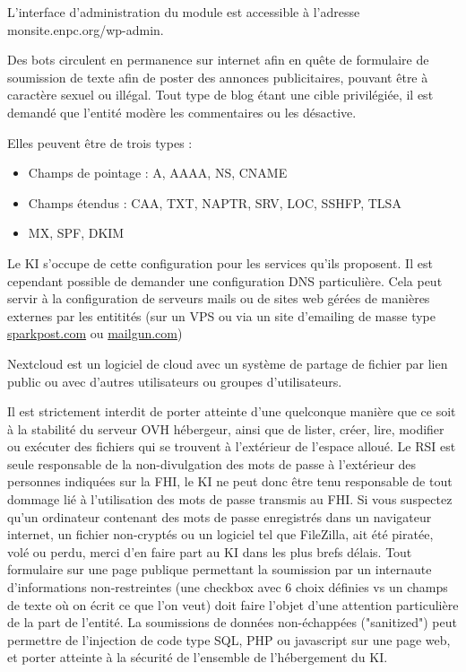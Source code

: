 \documentclass{ki019}
\begin{document}


L'interface d'administration du module est accessible à l'adresse monsite.enpc.org/wp-admin.

Des bots circulent en permanence sur internet afin en quête de formulaire de soumission de texte afin de poster des annonces publicitaires, pouvant être à caractère sexuel ou illégal. Tout type de blog étant une cible privilégiée, il est demandé que l'entité modère les commentaires ou les désactive.


Elles peuvent être de trois types :
\begin{itemize}
\item Champs de pointage : A, AAAA, NS, CNAME
\item Champs étendus : CAA, TXT, NAPTR, SRV, LOC, SSHFP, TLSA
\item MX, SPF, DKIM
\end{itemize}

Le KI s'occupe de cette configuration pour les services qu'ils proposent. Il est cependant possible de demander une configuration DNS particulière.
Cela peut servir à la configuration de serveurs mails ou de sites web gérées de manières externes par les entitités (sur un VPS ou via un site d'emailing de masse type \url{sparkpost.com} ou \url{mailgun.com})


Nextcloud est un logiciel de cloud avec un système de partage de fichier par lien public ou avec d'autres utilisateurs ou groupes d'utilisateurs.



Il est strictement interdit de porter atteinte d'une quelconque manière que ce soit à la stabilité du serveur OVH hébergeur, ainsi que de lister, créer, lire, modifier ou exécuter des fichiers qui se trouvent à l'extérieur de l'espace alloué.
Le RSI est seule responsable de la non-divulgation des mots de passe à l'extérieur des personnes indiquées sur la FHI, le KI ne peut donc être tenu responsable de tout dommage lié à l'utilisation des mots de passe transmis au FHI. Si vous suspectez qu'un ordinateur contenant des mots de passe enregistrés dans un navigateur internet, un fichier non-cryptés ou un logiciel tel que FileZilla, ait été piratée, volé ou perdu, merci d'en faire part au KI dans les plus brefs délais.
Tout formulaire sur une page publique permettant la soumission par un internaute d'informations non-restreintes (une checkbox avec 6 choix définies vs un champs de texte où on écrit ce que l'on veut) doit faire l'objet d'une attention particulière de la part de l'entité. La soumissions de données non-échappées ("sanitized") peut permettre de l'injection de code type SQL, PHP ou javascript sur une page web, et porter atteinte à la sécurité de l'ensemble de l'hébergement du KI.
\end{document}
